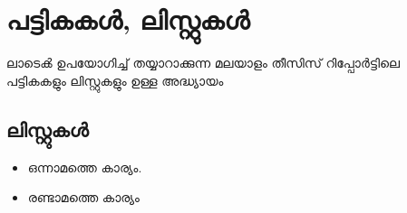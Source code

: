  
\chapter{പട്ടികകൾ, ലിസ്റ്റുകൾ}
ലാടെൿ ഉപയോഗിച്ച് തയ്യാറാക്കുന്ന മലയാളം തീസിസ് റിപ്പോർട്ടിലെ പട്ടികകളും ലിസ്റ്റുകളും ഉള്ള അദ്ധ്യായം

\section{ലിസ്റ്റുകൾ}

\begin{itemize}
\item ഒന്നാമത്തെ കാര്യം.
\item രണ്ടാമത്തെ കാര്യം
\end{itemize}
